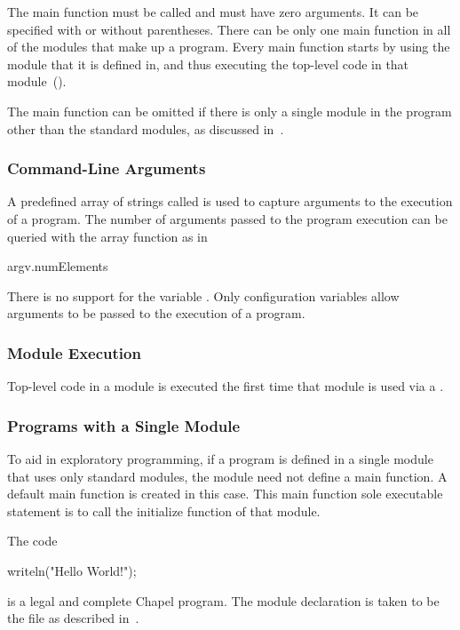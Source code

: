 The main function must be called  and must have zero
arguments.  It can be specified with or without parentheses.  There
can be only one main function in all of the modules that make up a
program.  Every main function starts by using the module that it is
defined in, and thus executing the top-level code in that
module~().

The main function can be omitted if there is only a single module in
the program other than the standard modules, as discussed
in~.

\subsubsection{Command-Line Arguments}
\label{Command_Line_Arguments}

A predefined array of strings called  is used to capture
arguments to the execution of a program.
The number of arguments passed to the program execution can be queried
with the array  function as in
\begin{chapel}
argv.numElements
\end{chapel}

\begin{status}
There is no support for the variable .  Only configuration
variables allow arguments to be passed to the execution of a program.
\end{status}

\subsubsection{Module Execution}
\label{Module_Execution}

Top-level code in a module is executed the first time that module is
used via a .

\subsubsection{Programs with a Single Module}
\label{Programs_with_a_Single_Module}


To aid in exploratory programming, if a program is defined in a single
module that uses only standard modules, the module need not define a
main function.  A default main function is created in this case.  This
main function sole executable statement is to call the initialize
function of that module.
\begin{example}
The code
\begin{chapel}
writeln("Hello World!");
\end{chapel}
is a legal and complete Chapel program.  The module declaration is
taken to be the file as described in~.
\end{example}

